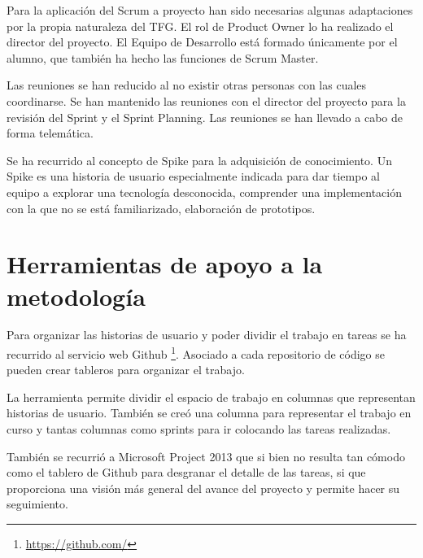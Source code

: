 Para la aplicación del Scrum a proyecto han sido necesarias algunas adaptaciones por la propia naturaleza del TFG. El rol de Product Owner lo ha realizado el director del proyecto. El Equipo de Desarrollo está formado únicamente por el alumno, que también ha hecho las funciones de Scrum Master.

Las reuniones se han reducido al no existir otras personas con las cuales coordinarse. Se han mantenido las reuniones con el director del proyecto para la revisión del Sprint y el Sprint Planning. Las reuniones se han llevado a cabo de forma telemática.

Se ha recurrido al concepto de Spike para la adquisición de conocimiento. Un Spike es una historia de usuario especialmente indicada para dar tiempo al equipo a explorar una tecnología desconocida, comprender una implementación con la que no se está familiarizado, elaboración de prototipos.

\section{Herramientas de apoyo a la metodología}

Para organizar las historias de usuario y poder dividir el trabajo en tareas se ha recurrido al servicio web Github \footnote{\url{https://github.com/}}. Asociado a cada repositorio de código se pueden crear tableros para organizar el trabajo.

La herramienta permite dividir el espacio de trabajo en columnas que representan historias de usuario. También se creó una columna para representar el trabajo en curso y tantas columnas como sprints para ir colocando las tareas realizadas.

También se recurrió a Microsoft Project 2013 que si bien no resulta tan cómodo como el tablero de Github para desgranar el detalle de las tareas, si que proporciona una visión más general del avance del proyecto y permite hacer su seguimiento.
